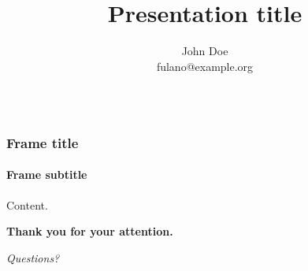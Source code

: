 \documentclass{beamer}
\begin{document}
\title{Presentation title}
\author[J. Doea]{John Doe \\
fulano@example.org \\~
}


\begin{frame}
    \maketitle
\end{frame}

\begin{frame}[fragile]
    \frametitle{Frame title}
    \framesubtitle{Frame subtitle}
    Content.
\end{frame}

\begin{frame}[final]
    \Huge \textbf{Thank you for your attention.}

    \bigskip

    \large \textit{Questions?}
\end{frame}
\end{document}
